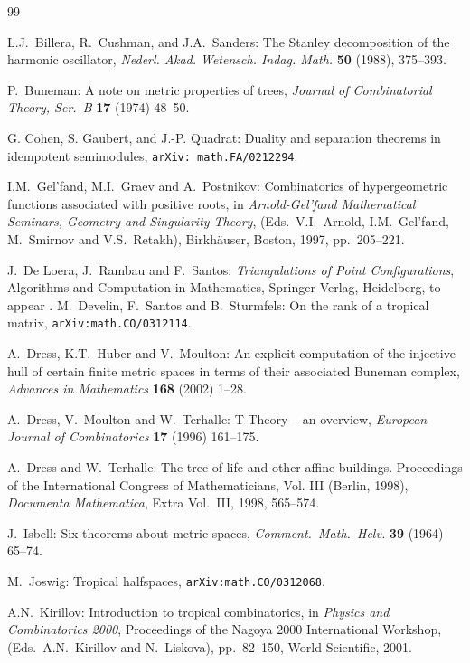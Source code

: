 \documentclass[11pt]{amsart}
\begin{document}
\begin{thebibliography}{99}

 L.J.~Billera, R.~Cushman, and J.A.~Sanders:
The Stanley decomposition of the harmonic oscillator,
\emph{Nederl. Akad. Wetensch. Indag. Math.} {\bf 50} (1988), 375--393.

 P.~Buneman: A note on metric properties of trees,
\emph{Journal of Combinatorial Theory, Ser.~B}
{\bf 17} (1974) 48--50.

 G. Cohen, S. Gaubert, and J.-P. Quadrat:
Duality and separation theorems in idempotent semimodules,
{\tt arXiv: math.FA/0212294}.

 I.M.~Gel'fand, M.I.~Graev and A.~Postnikov:
Combinatorics of hypergeometric functions associated with
positive roots, in \emph{Arnold-Gel'fand Mathematical Seminars,
Geometry and Singularity Theory}, (Eds.~V.I.~Arnold, I.M.~Gel'fand,
M.~Smirnov and V.S.~Retakh), Birkh\"auser, Boston, 1997, pp.~205--221.

 J.~De Loera, J.~Rambau and F.~Santos:
\emph{Triangulations of Point Configurations},
Algorithms and Computation in Mathematics, 
Springer Verlag, Heidelberg, to appear
.
 M.~Develin, F.~Santos and B.~Sturmfels: On the rank of a 
tropical matrix, {\tt arXiv:math.CO/0312114}.

 A.~Dress, K.T.~Huber and V.~Moulton:
An explicit computation of the injective hull of certain
finite metric spaces in terms of their associated
Buneman complex, \emph{Advances in Mathematics} {\bf 168} (2002) 1--28.

A.~Dress, V.~Moulton and W.~Terhalle:
T-Theory -- an overview,
\emph{European Journal of Combinatorics} 
{\bf 17} (1996) 161--175.

A.~Dress and W.~Terhalle:
The tree of life and other affine buildings. 
Proceedings of the International Congress of
  Mathematicians, Vol. III (Berlin, 1998),
\emph{Documenta Mathematica}, Extra Vol.~III, 1998, 565--574.


 J.~Isbell: Six theorems about metric spaces,
\emph{Comment.~Math.~Helv.} {\bf 39} (1964) 65--74.

 M.~Joswig: Tropical halfspaces, {\tt arXiv:math.CO/0312068}.

 A.N.~Kirillov: Introduction to tropical combinatorics,
in \emph{Physics and Combinatorics 2000}, Proceedings of the
Nagoya 2000 International Workshop,
(Eds.~A.N.~Kirillov and N.~Liskova), pp.~82--150,
World Scientific, 2001.


\end{thebibliography}
\end{document}
